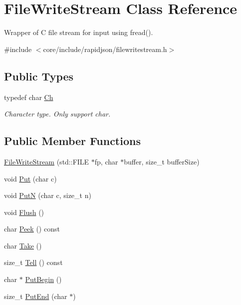 \hypertarget{classFileWriteStream}{}\section{File\+Write\+Stream Class Reference}
\label{classFileWriteStream}


Wrapper of C file stream for input using fread().  




{\ttfamily \#include $<$core/include/rapidjson/filewritestream.\+h$>$}

\subsection*{Public Types}
\begin{DoxyCompactItemize}
\item 
typedef char \hyperlink{classFileWriteStream_abc16aeb69ad4176263ddfcb837fb7b49}{Ch}
\begin{DoxyCompactList}\small\item\em Character type. Only support char. \end{DoxyCompactList}\end{DoxyCompactItemize}
\subsection*{Public Member Functions}
\begin{DoxyCompactItemize}
\item 
\hyperlink{classFileWriteStream_a553ea3e7377a7f7cace2daa3cc90e1a1}{File\+Write\+Stream} (std\+::\+F\+I\+LE $\ast$fp, char $\ast$buffer, size\+\_\+t buffer\+Size)
\item 
void \hyperlink{classFileWriteStream_af6a6061d0accd939fa475b9b34427d85}{Put} (char c)
\item 
void \hyperlink{classFileWriteStream_ad9ec108b24316a2c1c83c6ddc75d308a}{PutN} (char c, size\+\_\+t n)
\item 
void \hyperlink{classFileWriteStream_a939fbf183ba36464c5e0837df4329d37}{Flush} ()
\item 
char \hyperlink{classFileWriteStream_a83a8321c33738544f05330f3638e51c0}{Peek} () const 
\item 
char \hyperlink{classFileWriteStream_ac927a0ae09a85eaba58a74ceb04b40ed}{Take} ()
\item 
size\+\_\+t \hyperlink{classFileWriteStream_a72889b68dbd766cea0e003389b990722}{Tell} () const 
\item 
char $\ast$ \hyperlink{classFileWriteStream_a4d1340a64fde3f16ac2afce19537c75e}{Put\+Begin} ()
\item 
size\+\_\+t \hyperlink{classFileWriteStream_a54b14047e4c998db0594290605f8f0dc}{Put\+End} (char $\ast$)
\end{DoxyCompactItemize}


